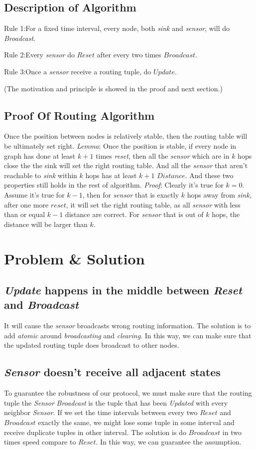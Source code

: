 \documentclass[a4paper]{article}
\begin{document}
\subsection{Description of Algorithm}
Rule 1:For a fixed time interval, every node, both \emph{sink} and \emph{sensor}, will do \emph{Broadcast}.

Rule 2:Every \emph{sensor} do $Reset$ after every two times $Broadcast$.

Rule 3:Once a \emph{sensor} receive a routing tuple, do $Update$.

(The motivation and principle is showed in the proof and next section.)

\subsection{Proof Of Routing Algorithm}
Once the position between nodes is relatively stable, then the routing table will be ultimately set right.
\emph{Lemma}: Once the position is stable, if every node in graph has done at least $k+1$ times \emph{reset}, then all the \emph{sensor} which are in $k$ hops close the the sink will set the right routing table. And all the \emph{sensor} that aren't reachable to \emph{sink} within $k$ hops has at least $k+1$ $Distance$. And these two properties still holds in the rest of algorithm.
\emph{Proof}: Clearly it's true for $k=0$.
Assume it's true for $k-1$, then for \emph{sensor} that is exactly $k$ hops away from \emph{sink}, after one more $reset$, it will set the right routing table, as all \emph{sensor} with less than or equal $k-1$ distance are correct. For \emph{sensor} that is out of $k$ hops, the distance will be larger than $k$.


\section{Problem \& Solution}
\subsection{\emph{Update} happens in the middle between \emph{Reset} and \emph{Broadcast} }
It will cause the \emph{sensor} broadcasts wrong routing information. The solution is to add \emph{atomic} around \emph{broadcasting} and \emph{clearing}. In this way, we can make sure that the updated routing tuple does broadcast to other nodes.
\subsection{\emph{Sensor} doesn't receive all adjacent states}
To guarantee the robustness of our protocol, we must make sure that the routing tuple the \emph{Sensor} \emph{Broadcast} is the tuple that has been \emph{Updated} with every neighbor \emph{Sensor}. If we set the time intervals between every two $Reset$ and $Broadcast$ exactly the same, we might lose some tuple in some interval and receive duplicate tuples in other interval. The solution is do $Broadcast$ in two times speed compare to $Reset$. In this way, we can guarantee the assumption.
\end{document}
